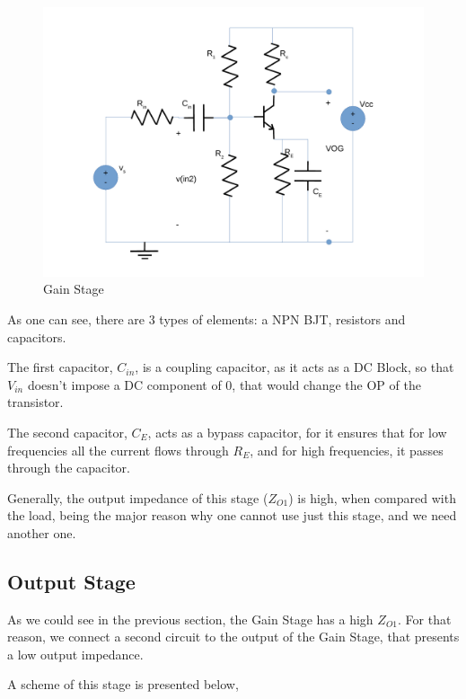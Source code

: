 \begin{figure}[h]
    \centering
    \includegraphics[scale=0.4]{gain_stage_l4.pdf}
    \caption{Gain Stage}
    \label{fig:gain_stage}
\end{figure}

As one can see, there are 3 types of elements: a NPN BJT, resistors and capacitors.

The first capacitor, $C_{in}$, is a coupling capacitor, as it acts as a DC Block, so that $V_{in}$ doesn't impose a DC component of 0, that would change the OP of the transistor.

The second capacitor, $C_E$, acts as a bypass capacitor, for it ensures that for low frequencies all the current flows through $R_E$, and for high frequencies, it passes through the capacitor.

Generally, the output impedance of this stage ($Z_{O1}$) is high, when compared with the load, being the major reason why one cannot use just this stage, and we need another one.

\subsection{Output Stage}

As we could see in the previous section, the Gain Stage has a high $Z_{O1}$. For that reason, we connect a second circuit to the output of the Gain Stage, that presents a low output impedance.

A scheme of this stage is presented below, 

